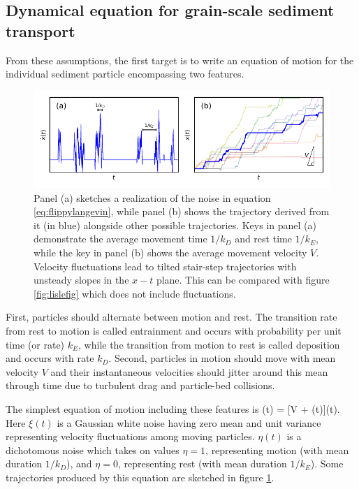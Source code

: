 \subsection{Dynamical equation for grain-scale sediment transport}
From these assumptions, the first target is to write an equation of motion for the individual sediment particle encompassing two features.
\begin{figure}
	\centerline{\includegraphics{./figures/ch2/fig0mod.pdf}}
	\caption{Panel (a) sketches a realization of the noise in equation \ref{eq:flippylangevin}, while panel (b) shows the trajectory derived from it (in blue) alongside other possible trajectories. Keys in panel (a) demonstrate the average movement time $1/k_D$ and rest time $1/k_E$, while the key in panel (b) shows the average movement velocity $V$. Velocity fluctuations lead to tilted stair-step trajectories with unsteady slopes in the $x-t$ plane. This can be compared with figure \ref{fig:lislefig} which does not include fluctuations.}
	\label{fig:fluxxy0}
\end{figure}
First, particles should alternate between motion and rest.
The transition rate from rest to motion is called entrainment and occurs with probability per unit time (or rate) $k_E$, while the transition from motion to rest is called deposition and occurs with rate $k_D$.
Second, particles in motion should move with mean velocity $V$ and their instantaneous velocities should jitter around this mean through time due to turbulent drag and particle-bed collisions.

The simplest equation of motion including these features is
\be {}(t) = [V + \xi(t)]\eta(t).  \label{eq:flippylangevin} \ee
Here $\xi(t)$ is a Gaussian white noise having zero mean and unit variance representing velocity fluctuations among moving particles. $\eta(t)$ is a dichotomous noise which takes on values $\eta = 1$, representing motion (with mean duration $1/k_D$), and $\eta=0$, representing rest (with mean duration $1/k_E$).
Some trajectories produced by this equation are sketched in figure \ref{fig:fluxxy0}.

